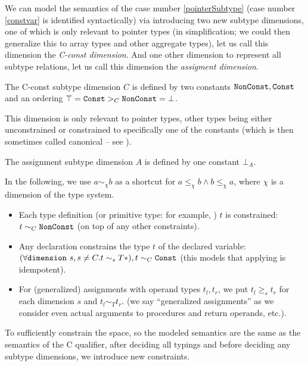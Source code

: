 We can model the semantics of the case number \ref{pointerSubtype} (case number \ref{constvar} is identified syntactically) via introducing two new subtype dimensions, one of which is only relevant to pointer types (in simplification; we could then generalize this to array types and other aggregate types), let us call this dimension the \emph{C-const dimension}. And one other dimension to represent all subtype relations, let us call this dimension the \emph{assigment dimension}.

\begin{defn}
    The C-const subtype dimension $C$ is defined by two constants $\mathtt{NonConst}, \mathtt{Const}$ and an ordering $\top = \mathtt{Const} >_C \mathtt{NonConst} = \bot$.

    This dimension is only relevant to pointer types, other types being either unconstrained or constrained to specifically one of the constants (which is then sometimes called canonical -- see \cite{tiuryn1999subtyping}).
\end{defn}

\begin{defn}
    The assignment subtype dimension $A$ is defined by one constant $\bot_A$.
\end{defn}

In the following, we use $a \sim_\chi b$ as a shortcut for $a \leq_\chi b \land b \leq_\chi a$, where $\chi$ is a dimension of the type system.

\begin{itemize}
    \item Each type definition (or primitive type: for example, ) $t$ is constrained: $t \sim_C \mathtt{NonConst}$ (on top of any other constraints).

    \item Any declaration  constrains the type $t$ of the declared variable: $(\forall \mathtt{dimension}\ s, s \neq C. t \sim_s T\ast), t \sim_C \mathtt{Const}$ (this models that applying  is idempotent).

    \item For (generalized) assignments with operand types $t_l, t_r$, we put $t_l \geq_s t_r$ for each dimension $s$ and $t_l \sim_T t_r$. (we say ``generalized assignments'' as we consider even actual arguments to procedures and return operands, etc.).
\end{itemize}

To sufficiently constrain the space, so the modeled semantics are the same as the semantics of the C  qualifier, after deciding all typings and before deciding any subtype dimensions, we introduce new constraints.

